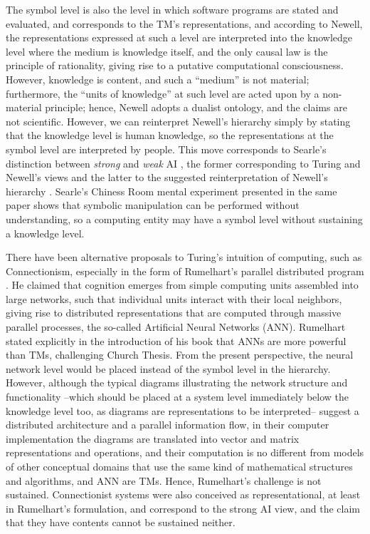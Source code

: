 \documentclass[11pt]{article}
\begin{document}
The symbol level is also the level in which software programs are stated and evaluated, and corresponds to the TM's representations, and according to Newell, the representations expressed at such a level are interpreted into the knowledge level where the medium is knowledge itself, and the only causal law is the principle of rationality, giving rise to a putative computational consciousness. However, knowledge is content, and such a ``medium'' is not material; furthermore, the ``units of knowledge'' at such level are acted upon by a non-material principle; hence, Newell adopts a dualist ontology, and the claims are not scientific. However, we can reinterpret Newell's hierarchy simply by stating that the knowledge level is human knowledge, so the representations at the symbol level are interpreted by people. This move corresponds to Searle's distinction between \emph{strong} and \emph{weak} AI \cite{Searle}, the former corresponding to Turing and Newell's views and the latter to the suggested reinterpretation of Newell's hierarchy \cite{Pineda-2024}. Searle's Chiness Room mental experiment presented in the same paper shows that symbolic manipulation can be performed without understanding, so a computing entity may have a symbol level without sustaining a knowledge level.

There have been alternative proposals to Turing's intuition of computing, such as Connectionism, especially in the form of Rumelhart's parallel distributed program \cite{Rumelhart}. He claimed that cognition emerges from simple computing units assembled into large networks, such that individual units interact with their local neighbors, giving rise to distributed representations \cite{Hinton-1986} that are computed through massive parallel processes, the so-called Artificial Neural Networks (ANN). Rumelhart stated explicitly in the introduction of his book that ANNs are more powerful than TMs, challenging Church Thesis. From the present perspective, the neural network level would be placed instead of the symbol level in the hierarchy. However, although the typical diagrams illustrating the network structure and functionality --which should be placed at a system level immediately below the knowledge level too, as diagrams are representations to be interpreted-- suggest a distributed architecture and a parallel information flow, in their computer implementation the diagrams are translated into vector and matrix representations and operations, and their computation is no different from models of other conceptual domains that use the same kind of mathematical structures and algorithms, and ANN are TMs. Hence, Rumelhart's challenge is not sustained. Connectionist systems were also conceived as representational, at least in Rumelhart's formulation, and correspond to the strong AI view, and the claim that they have contents cannot be sustained neither.
\end{document}

